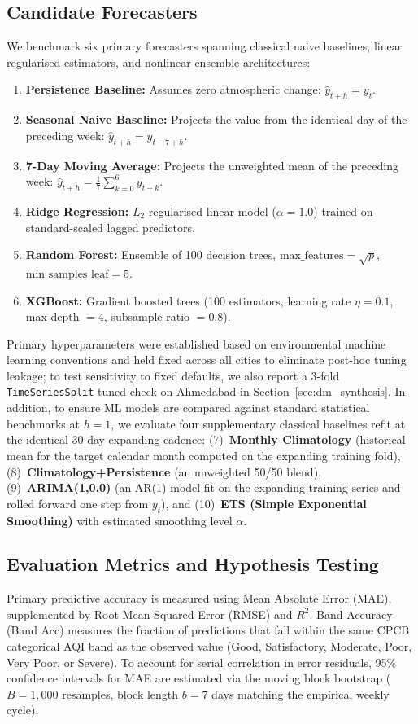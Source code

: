 \subsection{Candidate Forecasters}
We benchmark six primary forecasters spanning classical naive baselines, linear regularised estimators, and nonlinear ensemble architectures:
\begin{enumerate}
  \item \textbf{Persistence Baseline:} Assumes zero atmospheric change: $\hat{y}_{t+h} = y_t$.
  \item \textbf{Seasonal Naive Baseline:} Projects the value from the identical day of the preceding week: $\hat{y}_{t+h} = y_{t-7+h}$.
  \item \textbf{7-Day Moving Average:} Projects the unweighted mean of the preceding week: $\hat{y}_{t+h} = \frac{1}{7}\sum_{k=0}^{6} y_{t-k}$.
  \item \textbf{Ridge Regression:} $L_2$-regularised linear model ($\alpha = 1.0$) trained on standard-scaled lagged predictors.
  \item \textbf{Random Forest:} Ensemble of 100 decision trees, $\text{max\_features} = \sqrt{p}$, $\text{min\_samples\_leaf} = 5$.
  \item \textbf{XGBoost:} Gradient boosted trees (100 estimators, learning rate $\eta = 0.1$, max depth $= 4$, subsample ratio $= 0.8$).
\end{enumerate}
Primary hyperparameters were established based on environmental machine learning conventions and held fixed across all cities to eliminate post-hoc tuning leakage; to test sensitivity to fixed defaults, we also report a 3-fold \texttt{TimeSeriesSplit} tuned check on Ahmedabad in Section~\ref{sec:dm_synthesis}. In addition, to ensure ML models are compared against standard statistical benchmarks at $h=1$, we evaluate four supplementary classical baselines refit at the identical 30-day expanding cadence: (7)~\textbf{Monthly Climatology} (historical mean for the target calendar month computed on the expanding training fold), (8)~\textbf{Climatology+Persistence} (an unweighted 50/50 blend), (9)~\textbf{ARIMA(1,0,0)} (an AR(1) model fit on the expanding training series and rolled forward one step from $y_t$), and (10)~\textbf{ETS (Simple Exponential Smoothing)} with estimated smoothing level $\alpha$.

\subsection{Evaluation Metrics and Hypothesis Testing}
Primary predictive accuracy is measured using Mean Absolute Error (MAE), supplemented by Root Mean Squared Error (RMSE) and $R^2$. Band Accuracy (Band Acc) measures the fraction of predictions that fall within the same CPCB categorical AQI band as the observed value (Good, Satisfactory, Moderate, Poor, Very Poor, or Severe). To account for serial correlation in error residuals, 95\% confidence intervals for MAE are estimated via the moving block bootstrap ($B = 1{,}000$ resamples, block length $b = 7$ days matching the empirical weekly cycle).

